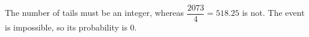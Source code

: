 The number of tails must be an integer, whereas $\dfrac{2073}{4}=518.25$ is not. The event is impossible, so its probability is $\boxed0$.
